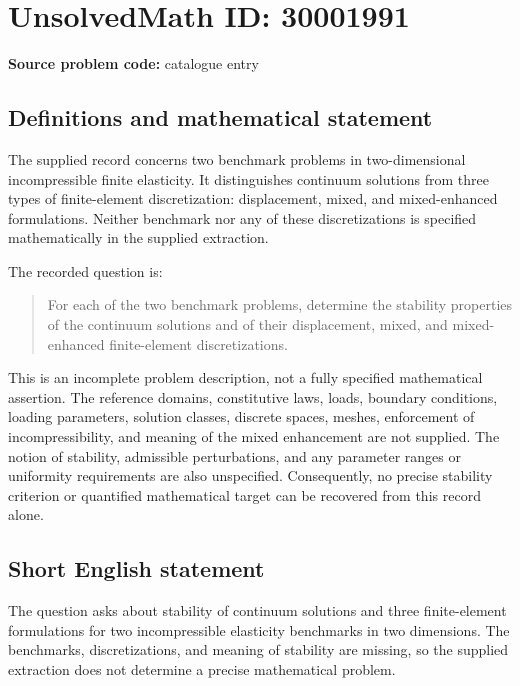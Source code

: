\documentclass[11pt]{article}
\begin{document}
\section*{UnsolvedMath ID: 30001991}
\textbf{Source problem code:} catalogue entry
\subsection{Definitions and mathematical statement}
The supplied record concerns two benchmark problems in two-dimensional incompressible finite elasticity. It distinguishes continuum solutions from three types of finite-element discretization: displacement, mixed, and mixed-enhanced formulations. Neither benchmark nor any of these discretizations is specified mathematically in the supplied extraction.

The recorded question is:
\begin{quote}
For each of the two benchmark problems, determine the stability properties of the continuum solutions and of their displacement, mixed, and mixed-enhanced finite-element discretizations.
\end{quote}

This is an incomplete problem description, not a fully specified mathematical assertion. The reference domains, constitutive laws, loads, boundary conditions, loading parameters, solution classes, discrete spaces, meshes, enforcement of incompressibility, and meaning of the mixed enhancement are not supplied. The notion of stability, admissible perturbations, and any parameter ranges or uniformity requirements are also unspecified. Consequently, no precise stability criterion or quantified mathematical target can be recovered from this record alone.
\subsection{Short English statement}
The question asks about stability of continuum solutions and three finite-element formulations for two incompressible elasticity benchmarks in two dimensions. The benchmarks, discretizations, and meaning of stability are missing, so the supplied extraction does not determine a precise mathematical problem.
\end{document}
